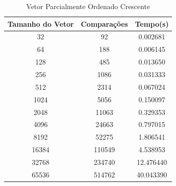 \documentclass[12pt,a4paper,twoside]{report}
\begin{document}
\begin{table}[h]
  \centering
  \caption{Vetor Parcialmente Ordenado Crescente \label{tab:poc}}
  \begin{tabular}{ccc} \\\hline
  \textbf{Tamanho do Vetor} & \textbf{Comparações} & \textbf{Tempo(s)} \\\hline
  32                        & 92                   & 0.002681          \\\hline
  64                        & 188                  & 0.006145          \\\hline
  128                       & 485                  & 0.013650          \\\hline
  256                       & 1086                 & 0.031333          \\\hline
  512                       & 2314                 & 0.067024          \\\hline
  1024                      & 5056                 & 0.150097          \\\hline
  2048                      & 11063                & 0.329353          \\\hline
  4096                      & 24663                & 0.797015         \\\hline
  8192                      & 52275                & 1.806541        \\\hline
  16384                     & 110549               & 4.538953        \\\hline
  32768                     & 234740               & 12.476440        \\\hline
  65536                     & 514762               & 40.043390        \\\hline
  \end{tabular}
\end{table}
\end{document}
